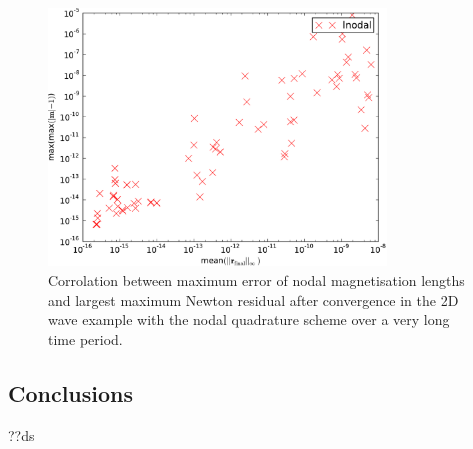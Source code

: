 \begin{figure}
  \centering
  \includegraphics[width=0.8\textwidth]
  {plots/2d_wave_solution_m_length_newton_res/-maxmaxmathbfm-1vsmeanmathbfr_mathrmfinal_infty.pdf}
  \caption{Corrolation between maximum error of nodal magnetisation lengths and largest maximum Newton residual after convergence in the 2D wave example with the nodal quadrature scheme over a very long time period.}
  \label{fig:mean-ml-error-2d-nodal-newton-tests}
\end{figure}









\subsection{Conclusions}

??ds


 